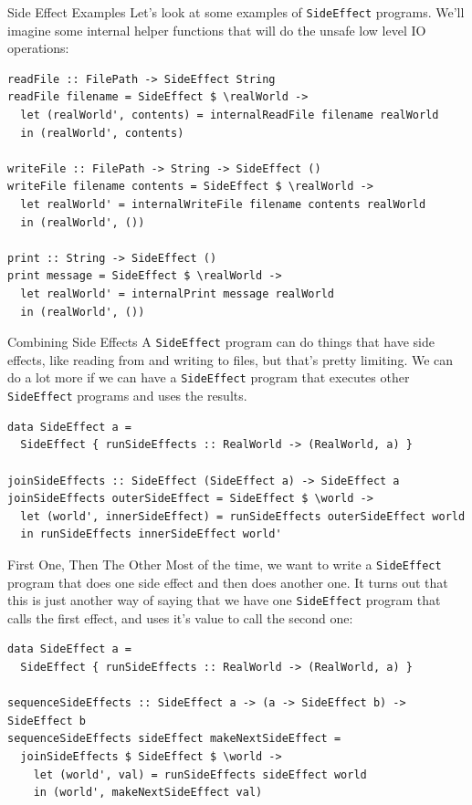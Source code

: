 \documentclass[10pt, presentation, colorlinks]{beamer}
\begin{document}
\begin{frame}[label={sec:org2125d77},fragile]{Side Effect Examples}
 Let's look at some examples of \texttt{SideEffect} programs. We'll imagine
some internal helper functions that will do the unsafe low level IO
operations:

\begin{verbatim}
readFile :: FilePath -> SideEffect String
readFile filename = SideEffect $ \realWorld ->
  let (realWorld', contents) = internalReadFile filename realWorld
  in (realWorld', contents)

writeFile :: FilePath -> String -> SideEffect ()
writeFile filename contents = SideEffect $ \realWorld ->
  let realWorld' = internalWriteFile filename contents realWorld
  in (realWorld', ())

print :: String -> SideEffect ()
print message = SideEffect $ \realWorld ->
  let realWorld' = internalPrint message realWorld
  in (realWorld', ())
\end{verbatim}
\end{frame}

\begin{frame}[label={sec:org27a3f19},fragile]{Combining Side Effects}
 A \texttt{SideEffect} program can do things that have side effects, like
reading from and writing to files, but that's pretty limiting. We can
do a lot more if we can have a \texttt{SideEffect} program that executes
other \texttt{SideEffect} programs and uses the results.

\begin{verbatim}
data SideEffect a =
  SideEffect { runSideEffects :: RealWorld -> (RealWorld, a) }

joinSideEffects :: SideEffect (SideEffect a) -> SideEffect a
joinSideEffects outerSideEffect = SideEffect $ \world ->
  let (world', innerSideEffect) = runSideEffects outerSideEffect world
  in runSideEffects innerSideEffect world'
\end{verbatim}
\end{frame}

\begin{frame}[label={sec:org4f5dcc2},fragile]{First One, Then The Other}
 Most of the time, we want to write a \texttt{SideEffect} program that does
one side effect \alert{and then} does another one. It turns out that this is
just another way of saying that we have one \texttt{SideEffect} program that
calls the first effect, and uses it's value to call the second one:

\begin{verbatim}
data SideEffect a =
  SideEffect { runSideEffects :: RealWorld -> (RealWorld, a) }

sequenceSideEffects :: SideEffect a -> (a -> SideEffect b) -> SideEffect b
sequenceSideEffects sideEffect makeNextSideEffect =
  joinSideEffects $ SideEffect $ \world ->
    let (world', val) = runSideEffects sideEffect world
    in (world', makeNextSideEffect val)
\end{verbatim}
\end{frame}
\end{document}
